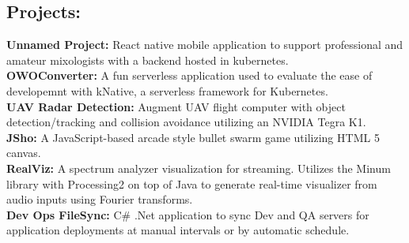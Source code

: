 \documentclass{res}
\begin{document}
\begin{resume}
\section{Projects:}          
{
	\textbf{Unnamed Project:} React native mobile application to support professional and amateur mixologists with a backend hosted in kubernetes.\\
	\textbf{OWOConverter:} A fun serverless application used to evaluate the ease of developemnt with kNative, a serverless framework for Kubernetes.\\
	\textbf{UAV Radar Detection:} Augment UAV flight computer with object detection/tracking and collision avoidance utilizing an NVIDIA Tegra K1.\\
	\textbf{JSho:} A JavaScript-based arcade style bullet swarm game utilizing HTML 5 canvas.\\
	\textbf{RealViz:} A spectrum analyzer visualization for streaming. Utilizes the Minum library with Processing2 on top of Java to generate real-time visualizer from audio inputs using Fourier transforms.\\
	\textbf{Dev Ops FileSync:} C\# .Net application to sync Dev and QA servers for application deployments at manual intervals or by automatic schedule.
}
\end{resume}
\end{document}
